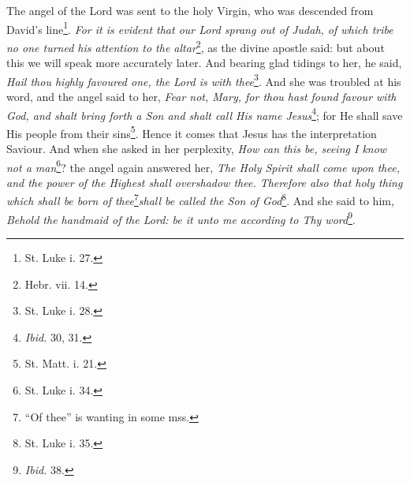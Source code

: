 The angel of the Lord was sent to the holy Virgin, who was descended from David’s line\footnote{St. Luke i. 27.}. \emph{For it is evident that our Lord sprang out of Judah, of which tribe no one turned his attention to the altar}\footnote{Hebr. vii. 14.}, as the divine apostle said: but about this we will speak more accurately later. And bearing glad tidings to her, he said, \emph{Hail thou highly favoured one, the Lord is with thee}\footnote{St. Luke i. 28.}. And she was troubled at his word, and the angel said to her, \emph{Fear not, Mary, for thou hast found favour with God, and shalt bring forth a Son and shalt call His name Jesus}\footnote{\emph{Ibid.} 30, 31.}; for He shall save His people from their sins\footnote{St. Matt. i. 21.}. Hence it comes that Jesus has the interpretation Saviour. And when she asked in her perplexity, \emph{How can this be, seeing I know not a man}\footnote{St. Luke i. 34.}? the angel again answered her, \emph{The Holy Spirit shall come upon thee, and the power of the Highest shall overshadow thee. Therefore also that holy thing which shall be born of thee}\footnote{“Of thee” is wanting in some mss.}\emph{shall be called the Son of God}\footnote{St. Luke i. 35.}. And she said to him, \emph{Behold the handmaid of the Lord: be it unto me according to Thy word}\footnote{\emph{Ibid.} 38.}.

